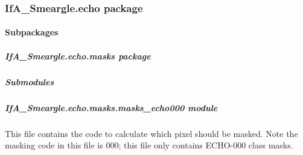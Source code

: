 \documentclass[letterpaper,10pt,english]{sphinxmanual}
\begin{document}
\subsubsection{IfA\_Smeargle.echo package}
\label{\detokenize{python_docstrings/IfA_Smeargle.echo:ifa-smeargle-echo-package}}\label{\detokenize{python_docstrings/IfA_Smeargle.echo::doc}}

\paragraph{Subpackages}
\label{\detokenize{python_docstrings/IfA_Smeargle.echo:subpackages}}

\subparagraph{IfA\_Smeargle.echo.masks package}
\label{\detokenize{python_docstrings/IfA_Smeargle.echo.masks:ifa-smeargle-echo-masks-package}}\label{\detokenize{python_docstrings/IfA_Smeargle.echo.masks::doc}}

\subparagraph{Submodules}
\label{\detokenize{python_docstrings/IfA_Smeargle.echo.masks:submodules}}

\subparagraph{IfA\_Smeargle.echo.masks.masks\_echo000 module}
\label{\detokenize{python_docstrings/IfA_Smeargle.echo.masks.masks_echo000:module-IfA_Smeargle.echo.masks.masks_echo000}}\label{\detokenize{python_docstrings/IfA_Smeargle.echo.masks.masks_echo000:ifa-smeargle-echo-masks-masks-echo000-module}}\label{\detokenize{python_docstrings/IfA_Smeargle.echo.masks.masks_echo000::doc}}
This file contains the code to calculate which pixel should be masked. Note the masking code
in this file is 000; this file only contains ECHO-000 class masks.
\end{document}
